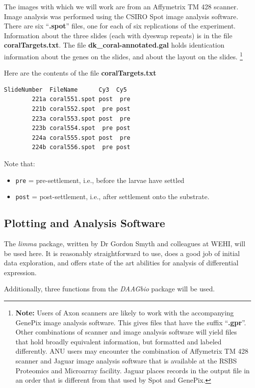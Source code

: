 \documentclass[a4paper,9pt]{article}\usepackage[]{graphicx}\usepackage[]{color}
\begin{document}
The images with which we will work are from an Affymetrix TM 428
scanner.  Image analysis was performed using the CSIRO Spot image
analysis software.  There are six ``\textbf{.spot}'' files, one for
each of six replications of the experiment.  Information about the
three slides (each with dyeswap repeats) is in the file
\textbf{coralTargets.txt}.  The file \textbf{dk\_coral-annotated.gal}
holds identication information about the genes on the slides, and
about the layout on the slides.  \footnote{\textbf{Note:} Users of
Axon scanners are likely to work with the accompanying GenePix image
analysis software. This gives files that have the suffix
``\textbf{.gpr}''.  Other combinations of scanner and image analysis
software will yield files that hold broadly equivalent information,
but formatted and labeled differently. ANU users may encounter the
combination of Affymetrix TM 428 scanner and Jaguar image analysis
software that is available at the RSBS Proteomics and Microarray
facility.  Jaguar places records in the output file in an order that
is different from that used by Spot and GenePix.}

Here are the contents of the file \textbf{coralTargets.txt}
\begin{verbatim}
SlideNumber  FileName      Cy3  Cy5
        221a coral551.spot post  pre
        221b coral552.spot  pre post
        223a coral553.spot post  pre
        223b coral554.spot  pre post
        224a coral555.spot post  pre
        224b coral556.spot  pre post
\end{verbatim}
Note that:
\begin{itemize}
\item [] \texttt{pre} = pre-settlement, i.e., before the larvae have settled
\item [] \texttt{post} = post-settlement, i.e., after settlement onto the
substrate.
\end{itemize}

\subsection{Plotting and Analysis Software}

The \textit{limma} package, written by Dr Gordon Smyth and colleagues
at WEHI, will be used here. It is reasonably straightforward to use,
does a good job of initial data exploration, and offers state of the
art abilities for analysis of differential expression.

Additionally, three functions from the \textit{DAAGbio} package will
be used.
\end{document}

